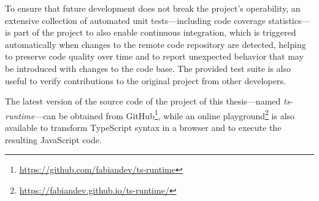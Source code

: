 To ensure that future development does not break the project's operability, an extensive collection of automated unit tests---including code coverage statistics---is part of the project to also enable continuous integration, which is triggered automatically when changes to the remote code repository are detected, helping to preserve code quality over time and to report unexpected behavior that may be introduced with changes to the code base. The provided test suite is also useful to verify contributions to the original project from other developers.

The latest version of the source code of the project of this thesis---named \emph{ts-runtime}---can be obtained from GitHub\footnote{\url{https://github.com/fabiandev/ts-runtime}}, while an online playground\footnote{\url{https://fabiandev.github.io/ts-runtime/}} is also available to transform TypeScript syntax in a browser and to execute the resulting JavaScript code.
